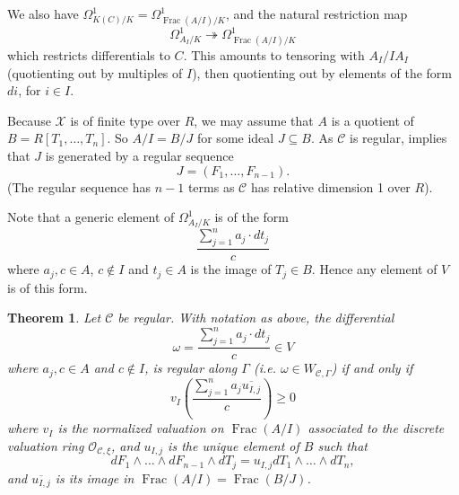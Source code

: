 \documentclass{article}
\theoremstyle{definition}
\theoremstyle{plain}
\newtheorem{thm}[defn]{Theorem}
\theoremstyle{remark}
\DeclareMathOperator{\Frac}{\mathrm{Frac}}
\newcommand{\onto}{\twoheadrightarrow}
\begin{document}
	We also have $\Omega^1_{K(C)/K} = \Omega^1_{\Frac(A/I)/K}$, and the natural restriction map
	\[\Omega^1_{A_{I}/K}\onto \Omega^1_{\Frac(A/I)/K}\]
	which restricts differentials to $C$. This amounts to tensoring with $A_I/IA_I$  (quotienting out by multiples of $I$), then quotienting out by elements of the form $di$, for $i\in I$.
	
	Because $\mathcal{X}$ is of finite type over $R$, we may assume that $A$ is a quotient of $B = R[T_1, \ldots, T_n]$. So $A/I = B/J$ for some ideal $J\subseteq B$. As $\mathcal{C}$ is regular, \cite[Corollary 6.3.22]{liu2002algebraic} implies that $J$ is generated by a regular sequence
	\[J = (F_1, \ldots, F_{n-1}).\]
	(The regular sequence has $n-1$ terms as $\mathcal{C}$ has relative dimension 1 over $R$).
	
	Note that a generic element of $\Omega^1_{A_I/K}$ is of the form
	\[\frac{\sum_{j=1}^n a_j \cdot dt_j}{c}\]
	where $a_j, c\in A$, $c\not\in I$ and $t_j\in A$ is the image of $T_j\in B$. Hence any element of $V$ is of this form.
	\begin{thm}
		Let $\mathcal{C}$ be regular. With notation as above, the differential
		\[\omega = \frac{\sum_{j=1}^n a_j \cdot dt_j}{c}\in V\]
		where $a_j, c\in A$ and $c\not\in I$, is regular along $\Gamma$ (i.e. $\omega \in W_{\mathcal{C}, \Gamma}$) if and only if
		\[v_I\left(\frac{\sum_{j=1}^n a_j\overline{u_{I, j}}}{c}\right)\ge 0\]
		where $v_I$ is the normalized valuation on $\Frac(A/I)$ associated to the discrete valuation ring $\mathcal{O}_{\mathcal{C}, \xi}$, and $u_{I,j}$ is the unique element of $B$ such that
		\[dF_1\wedge \ldots \wedge dF_{n-1}\wedge dT_j = u_{I,j}dT_1\wedge \ldots \wedge dT_n,\]
		and $\overline{u_{I,j}}$ is its image in $\Frac(A/I) = \Frac(B/J)$.
	\end{thm}
\end{document}
